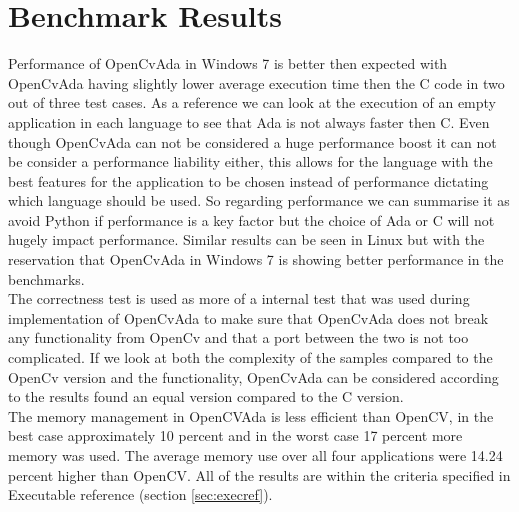 \section{Benchmark Results}
Performance of OpenCvAda in Windows 7 is better then expected with OpenCvAda having slightly lower average execution time then the C code in two out of three test cases. As a reference we can look at the execution of an empty application in each language to see that Ada is not always faster then C. Even though OpenCvAda can not be considered a huge performance boost it can not be consider a performance liability either, this allows for the language with the best features for the application to be chosen instead of performance dictating which language should be used. So regarding performance we can summarise it as avoid Python if performance is a key factor but the choice of Ada or C will not hugely impact performance. Similar results can be seen in Linux but with the reservation that OpenCvAda in Windows 7 is showing better performance in the benchmarks.
\\
The correctness test is used as more of a internal test that was used during implementation of OpenCvAda to make sure that OpenCvAda does not break any functionality from OpenCv and that a port between the two is not too complicated. If we look at both the complexity of the samples compared to the OpenCv version and the functionality, OpenCvAda can be considered according to the results found an equal version compared to the C version.
\\
The memory management in OpenCVAda is less efficient than OpenCV, in the best case approximately 10 percent and in the worst case 17 percent more memory was used. The average memory use over all four applications were 14.24 percent higher than OpenCV. All of the results are within the criteria specified in Executable reference (section \ref{sec:execref}).
